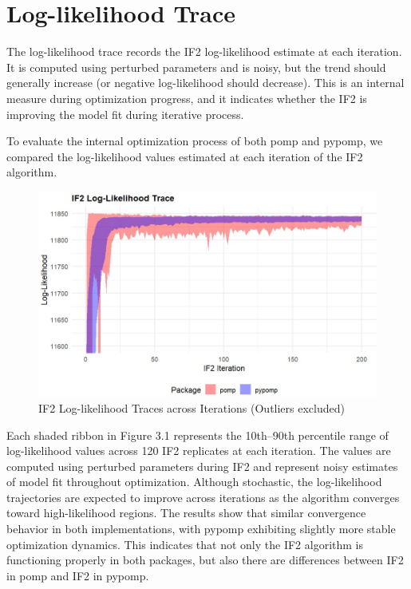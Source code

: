 \documentclass[11pt]{report}
\begin{document}
\section{Log-likelihood Trace}\label{sec:ll_trace}
The log-likelihood trace records the IF2 log-likelihood estimate at each iteration. It is computed using perturbed parameters and is noisy, but the trend should generally increase (or negative log-likelihood should decrease). This is an internal measure during optimization progress, and it indicates whether the IF2 is improving the model fit during iterative process.

To evaluate the internal optimization process of both pomp and pypomp, we compared the log-likelihood values estimated at each iteration of the IF2 algorithm.
\newpage
\begin{figure}[ht] 
\begin{center}
\includegraphics[width=\textwidth]{lltrace_zoomed.jpg}
\end{center}
\caption{IF2 Log-likelihood Traces across Iterations (Outliers excluded)}
\label{fig:if2lltrace}
\end{figure}
Each shaded ribbon in Figure 3.1 represents the 10th–90th percentile range of log-likelihood values across 120 IF2 replicates at each iteration. The values are computed using perturbed parameters during IF2 and represent noisy estimates of model fit throughout optimization. Although stochastic, the log-likelihood trajectories are expected to improve across iterations as the algorithm converges toward high-likelihood regions.
The results show that similar convergence behavior in both implementations, with pypomp exhibiting slightly more stable optimization dynamics. This indicates that not only the IF2 algorithm is functioning properly in both packages, but also there are differences between IF2 in pomp and IF2 in pypomp.
\end{document}

